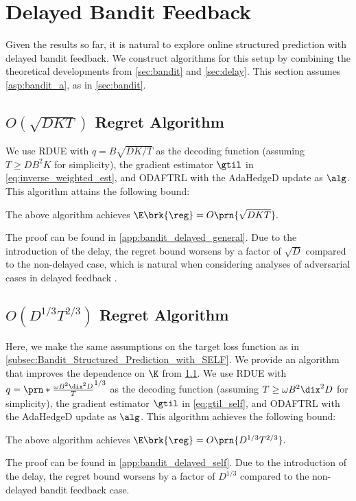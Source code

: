 \section{Delayed Bandit Feedback}\label{sec:bandit_and_delayed}
Given the results so far, it is natural to explore online structured prediction with delayed bandit feedback.
We construct algorithms for this setup by combining the theoretical developments from \cref{sec:bandit} and \cref{sec:delay}. 
This section assumes \cref{asp:bandit_a}, as in \cref{sec:bandit}.
\subsection{$O(\sqrt{D K T})$ Regret Algorithm}\label{subsec:bandit_delay_general}
We use RDUE with $q=B\sqrt{DK/T}$ as the decoding function (assuming $T\geq DB^2K$ for simplicity), the gradient estimator $\gtil$ in \eqref{eq:inverse_weighted_est},
and ODAFTRL with the AdaHedgeD update as $\alg$. 
This algorithm attains the following bound:
\begin{theorem}
    \label{thm:delay_bandit_bound_general_abstract}
    The above algorithm achieves
    $
        \E\brk{\reg} = O\prn{\sqrt{DKT}}.
    $
\end{theorem}
The proof can be found in \cref{app:bandit_delayed_general}.  
Due to the introduction of the delay, the regret bound worsens by a factor of $\sqrt{D}$ compared to the non-delayed case,
which is natural when considering analyses of adversarial cases in delayed feedback \citep{joulani13online,zimmert20optimal,manwani2022delaytronefficientlearningmulticlass}.



\subsection{$O(D^{1/3} T^{2/3})$ Regret Algorithm}\label{subsec:bandit_delay_self}
Here, we make the same assumptions on the target loss function as in \cref{subsec:Bandit_Structured_Prediction_with_SELF}.
We provide an algorithm that improves the dependence on $\K$ from \cref{subsec:bandit_delay_general}.
We use RDUE with $q=\prn*{\frac{\omega B^2 \dix^2 D}{T}}^{1/3}$ as the decoding function (assuming $T \geq \omega B^2 \dix^2 D$ for simplicity), the gradient estimator $\gtil$ in \eqref{eq:gtil_self}, and ODAFTRL with the AdaHedgeD update as $\alg$.
This algorithm achieves the following bound:
\begin{theorem}
    \label{thm:delay_bandit_bound_self_abstract}
    The above algorithm achieves
    $
        \E\brk{\reg} = O\prn{
            D^{1/3} T^{2/3}
        }.
    $
\end{theorem}
The proof can be found in \cref{app:bandit_delayed_self}.  
Due to the introduction of the delay, the regret bound worsens by a factor of $D^{1/3}$  
compared to the non-delayed bandit feedback case.

